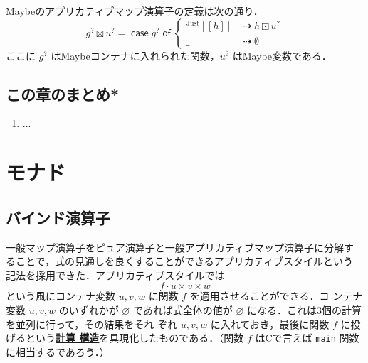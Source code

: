 \documentclass[a5paper,twoside,fleqn,draft]{jsbook}
\def\[{[\![}
\def\]{]\!]}
\newcommand{\programminglanguage}[1]{\textsf{#1}}
\newcommand{\clang}{\programminglanguage{C}}
\newcommand{\keyword}[1]{{\underline{\textbf{#1}}}}
\newcommand{\code}[1]{\texttt{#1}}
\newcommand{\mKeyword}[1]{\mathsf{#1}}
\newcommand{\mIfKeyword}{\mKeyword{if}}
\newcommand{\mCaseKeyword}{\mKeyword{case}}
\newcommand{\mOfKeyword}{\mKeyword{of}}
\newcommand{\mOtherwiseKeyword}{\mKeyword{otherwise}}
\DeclareMathOperator{\mCaseKW}{\mCaseKeyword}
\DeclareMathOperator{\mIf}{\mIfKeyword}
\DeclareMathOperator{\mOfKW}{\mOfKeyword}
\DeclareMathOperator{\mOtherwise}{\mOtherwiseKeyword}
\newcommand{\mNothing}{\emptyset}
\newcommand{\mPureNothing}{\varnothing}
\DeclareMathOperator{\mAppMap}{\times}
\DeclareMathOperator{\mAppMapMaybe}{\boxtimes}
\DeclareMathOperator{\mIfSo}{\dashrightarrow}
\DeclareMathOperator{\mLogicalAnd}{\wedge}
\DeclareMathOperator{\mMap}{\cdot}
\DeclareMathOperator{\mMapMaybe}{\boxdot}
\newcommand{\mValueConstructor}[1]{\mathrm{#1}}
\newcommand{\mValueWith}[2]{{}^\mValueConstructor{#1}\[#2\]}
\newcommand{\mJustWith}[1]{\mValueWith{Just}{#1}}
\newcommand{\mMaybe}[1]{{#1}^?}
\newcommand{\mCaseOf}[1]{\mCaseKW#1\mOfKW}
\begin{document}
Maybeのアプリカティブマップ演算子の定義は次の通り．
\begin{equation}
\label{eq:maybe-applicative-map-by-maybe-map}
\mMaybe{g}\mAppMapMaybe\mMaybe{u}
=\mCaseOf{\mMaybe{g}}
\begin{cases}
\mJustWith{h}&\mIfSo h\mMapMaybe\mMaybe{u}\\
\_&\mIfSo\mNothing
\end{cases}
\end{equation}
ここに $\mMaybe{g}$ はMaybeコンテナに入れられた関数，$\mMaybe{u}$ はMaybe変数である．

\section{この章のまとめ*}

\begin{enumerate}
\item ...
\end{enumerate}

\chapter{モナド}
\label{ch:monad}

\section{バインド演算子}

一般マップ演算子をピュア演算子と一般アプリカティブマップ演算子に分解す
ることで，式の見通しを良くすることができるアプリカティブスタイルという
記法を採用できた．アプリカティブスタイルでは
\begin{equation}
  f\mMap u\mAppMap v\mAppMap w
\end{equation}
という風にコンテナ変数 $u,v,w$ に関数 $f$ を適用させることができる．コ
ンテナ変数 $u,v,w$ のいずれかが $\mPureNothing$ であれば式全体の値が
$\mPureNothing$ になる．これは3個の計算を並列に行って，その結果をそれ
ぞれ $u,v,w$ に入れておき，最後に関数 $f$ に投げるという\keyword{計算
構造}を具現化したものである．（関数 $f$ は\clang で言えば
\code{main} 関数に相当するであろう．）
\end{document}
